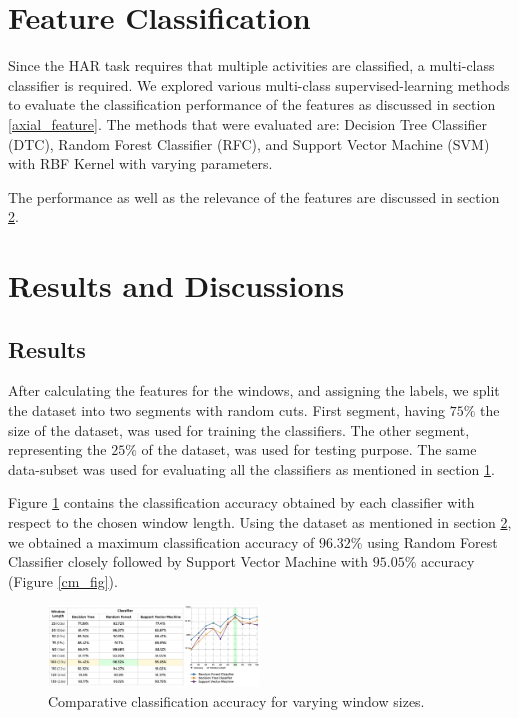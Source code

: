 \documentclass[5p]{elsarticle}
\begin{document}
\section{Feature Classification}
\label{feature_classification}

Since the \gls{HAR} task requires that multiple activities are classified, a multi-class classifier is required. We explored various multi-class supervised-learning methods to evaluate the classification performance of the features as discussed in section \ref{axial_feature}. The methods that were evaluated are: Decision Tree Classifier (\gls{DTC}), Random Forest Classifier (\gls{RFC}), and Support Vector Machine (\gls{SVM}) with \gls{RBF} Kernel with varying parameters.

The performance as well as the relevance of the features are discussed in section \ref{results}.

\section{Results and Discussions}
\label{results}
\subsection{Results}

After calculating the features for the windows, and assigning the labels, we split the dataset into two segments with random cuts. First segment, having $75\%$ the size of the dataset, was used for training the classifiers. The other segment, representing the $25\%$ of the dataset, was used for testing purpose. The same data-subset was used for evaluating all the classifiers as mentioned in section \ref{feature_classification}.

Figure \ref{cls_rpt} contains the classification accuracy obtained by each classifier with respect to the chosen window length. Using the dataset as mentioned in section \ref{results}, we obtained a maximum classification accuracy of $96.32\%$ using Random Forest Classifier closely followed by Support Vector Machine with $95.05\%$ accuracy (Figure \ref{cm_fig}).

\begin{figure}[b!]
  \centering
  \begin{center}
    \includegraphics[width=0.5\textwidth]{Classification_Report}
  \end{center}
  \vspace{-10pt}
  \caption{\label{cls_rpt}Comparative classification accuracy for varying window sizes.}
  \vspace{10pt}
\end{figure}
\end{document}
